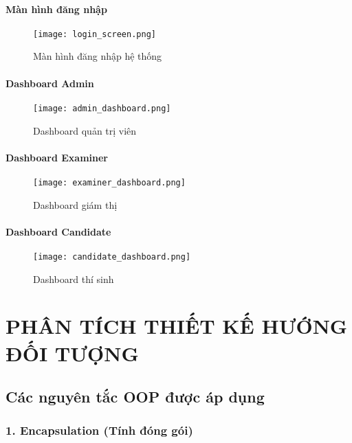 \documentclass[12pt,a4paper]{article}
\begin{document}
\paragraph{Màn hình đăng nhập}

\begin{figure}[H]
\centering
\texttt{[image: login\_screen.png]}
\caption{Màn hình đăng nhập hệ thống}
\label{fig:login_screen}
\end{figure}

\paragraph{Dashboard Admin}

\begin{figure}[H]
\centering
\texttt{[image: admin\_dashboard.png]}
\caption{Dashboard quản trị viên}
\label{fig:admin_dashboard}
\end{figure}

\paragraph{Dashboard Examiner}

\begin{figure}[H]
\centering
\texttt{[image: examiner\_dashboard.png]}
\caption{Dashboard giám thị}
\label{fig:examiner_dashboard}
\end{figure}

\paragraph{Dashboard Candidate}

\begin{figure}[H]
\centering
\texttt{[image: candidate\_dashboard.png]}
\caption{Dashboard thí sinh}
\label{fig:candidate_dashboard}
\end{figure}

\section{PHÂN TÍCH THIẾT KẾ HƯỚNG ĐỐI TƯỢNG}

\subsection{Các nguyên tắc OOP được áp dụng}

\subsubsection{1. Encapsulation (Tính đóng gói)}
\end{document}
